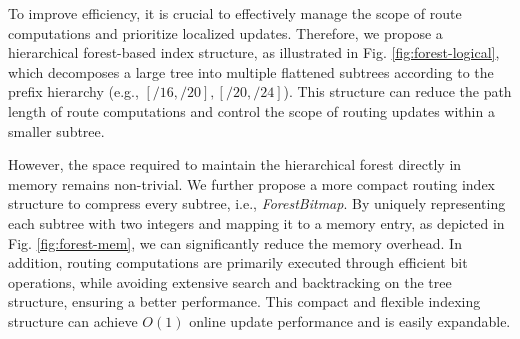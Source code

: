





 To improve efficiency, it is crucial to effectively manage the scope of route computations and prioritize localized updates. Therefore, we propose a hierarchical forest-based index structure, as illustrated in Fig. \ref{fig:forest-logical}, which decomposes a large tree into multiple flattened subtrees according to the prefix hierarchy (e.g., $[/16, /20], [/20, /24]$). This structure can reduce the path length of route computations and control the scope of routing updates within a smaller subtree.

However, the space required to maintain the hierarchical forest directly in memory remains non-trivial. We further propose a more compact routing index structure to compress every subtree, i.e., \emph{ForestBitmap}. By uniquely representing each subtree with two integers and mapping it to a memory entry, as depicted in Fig. \ref{fig:forest-mem}, we can significantly reduce the memory overhead. 
In addition, routing computations are primarily executed through efficient bit operations, while avoiding extensive search and backtracking on the tree structure, ensuring a better performance.
This compact and flexible indexing structure can achieve $O(1)$ online update performance and is easily expandable.

